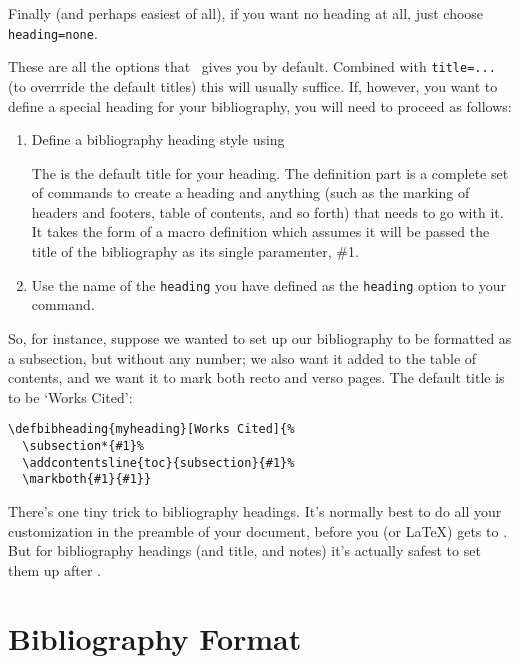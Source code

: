 Finally (and perhaps easiest of all), if you want no heading at all,
just choose \verb|heading=none|.

These are all the options that \biblatex\ gives you by
default. Combined with \verb|title=...| (to overrride the default
titles) this will usually
suffice. If, however, you want to define a special heading for your
bibliography, you will need to proceed as follows:
\begin{enumerate}
\item Define a bibliography heading style using
\begin{center}
  \end{center} The
   is the default title for your heading. The definition
  part is a complete set of commands to create a heading and anything
  (such as the marking of headers and footers, table of contents, and
  so forth) that needs to go with
  it. It takes the form of a macro definition which assumes it will be passed
  the title of the bibliography as its single paramenter, \#1.
\item Use the name of the \verb|heading| you have defined as the
  \verb|heading| option to your  command.
\end{enumerate}

So, for instance, suppose we wanted to set up our bibliography to be
formatted as a subsection, but without any number; we also want it
added to the table of contents, and we want it to mark both recto and
verso pages. The default title is to be `Works Cited':
\begin{verbatim}
\defbibheading{myheading}[Works Cited]{%
  \subsection*{#1}%
  \addcontentsline{toc}{subsection}{#1}%
  \markboth{#1}{#1}}
\end{verbatim}

There's one tiny trick to bibliography headings. It's normally best to
do all your customization in the preamble of your document, before you
(or \LaTeX) gets to . But for bibliography
headings (and title, and notes) it's actually safest to set them up
after .

\section{Bibliography Format}

